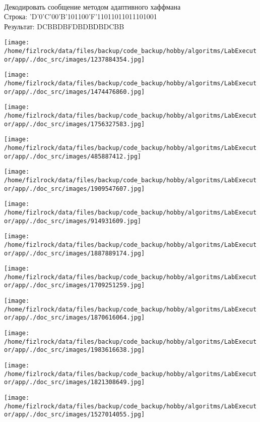 \documentclass[a4paper, 12pt]{article}
\begin{document}
\\ 

Декодировать сообщение методом адаптивного хаффмана \\
Строка: 
'D'0'C'00'B'101100'F'11011011011101001\\
Результат: DCBBDBFDBDBDBDCBB

\texttt{[image: /home/fizlrock/data/files/backup/code\_backup/hobby/algoritms/LabExecutor/app/./doc\_src/images/1237884354.jpg]}

\texttt{[image: /home/fizlrock/data/files/backup/code\_backup/hobby/algoritms/LabExecutor/app/./doc\_src/images/1474476860.jpg]}

\texttt{[image: /home/fizlrock/data/files/backup/code\_backup/hobby/algoritms/LabExecutor/app/./doc\_src/images/1756327583.jpg]}

\texttt{[image: /home/fizlrock/data/files/backup/code\_backup/hobby/algoritms/LabExecutor/app/./doc\_src/images/485887412.jpg]}

\texttt{[image: /home/fizlrock/data/files/backup/code\_backup/hobby/algoritms/LabExecutor/app/./doc\_src/images/1909547607.jpg]}

\texttt{[image: /home/fizlrock/data/files/backup/code\_backup/hobby/algoritms/LabExecutor/app/./doc\_src/images/914931609.jpg]}

\texttt{[image: /home/fizlrock/data/files/backup/code\_backup/hobby/algoritms/LabExecutor/app/./doc\_src/images/1887889174.jpg]}

\texttt{[image: /home/fizlrock/data/files/backup/code\_backup/hobby/algoritms/LabExecutor/app/./doc\_src/images/1709251259.jpg]}

\texttt{[image: /home/fizlrock/data/files/backup/code\_backup/hobby/algoritms/LabExecutor/app/./doc\_src/images/1870616064.jpg]}

\texttt{[image: /home/fizlrock/data/files/backup/code\_backup/hobby/algoritms/LabExecutor/app/./doc\_src/images/1983616638.jpg]}

\texttt{[image: /home/fizlrock/data/files/backup/code\_backup/hobby/algoritms/LabExecutor/app/./doc\_src/images/1821308649.jpg]}

\texttt{[image: /home/fizlrock/data/files/backup/code\_backup/hobby/algoritms/LabExecutor/app/./doc\_src/images/1527014055.jpg]}
\end{document}
